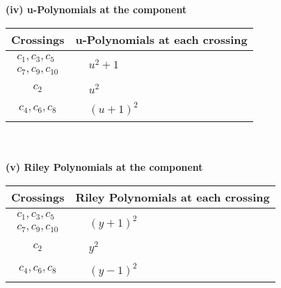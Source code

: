 \documentclass[1p]{elsarticle_modified}
\theoremstyle{definition}
\begin{document}
\newpage\renewcommand{\arraystretch}{1}
\flushleft \textbf{(iv) u-Polynomials at the component}\newline \\
\begin{tabular}{m{50pt}|m{274pt}}
Crossings & \hspace{64pt}u-Polynomials at each crossing \\
\hline $$\begin{aligned}c_{1},c_{3},c_{5}\\c_{7},c_{9},c_{10}\end{aligned}$$&$\begin{aligned}
&u^2+1
\end{aligned}$\\
\hline $$\begin{aligned}c_{2}\end{aligned}$$&$\begin{aligned}
&u^2
\end{aligned}$\\
\hline $$\begin{aligned}c_{4},c_{6},c_{8}\end{aligned}$$&$\begin{aligned}
&(u+1)^2
\end{aligned}$\\
\hline
\end{tabular}\\~\\
\newpage\renewcommand{\arraystretch}{1}
\flushleft \textbf{(v) Riley Polynomials at the component}\newline \\
\begin{tabular}{m{50pt}|m{274pt}}
Crossings & \hspace{64pt}Riley Polynomials at each crossing \\
\hline $$\begin{aligned}c_{1},c_{3},c_{5}\\c_{7},c_{9},c_{10}\end{aligned}$$&$\begin{aligned}
&(y+1)^2
\end{aligned}$\\
\hline $$\begin{aligned}c_{2}\end{aligned}$$&$\begin{aligned}
&y^2
\end{aligned}$\\
\hline $$\begin{aligned}c_{4},c_{6},c_{8}\end{aligned}$$&$\begin{aligned}
&(y-1)^2
\end{aligned}$\\
\hline
\end{tabular}\\~\\
\end{document}
